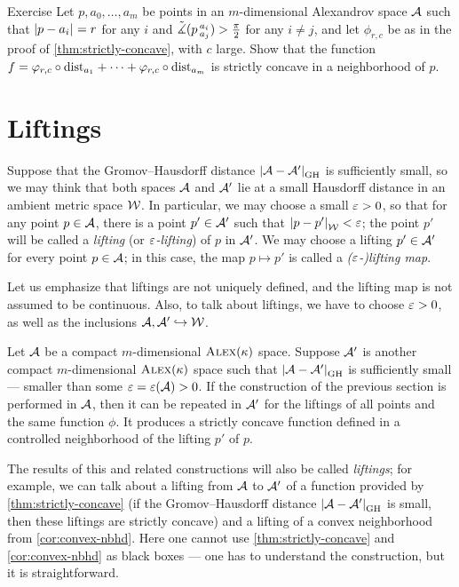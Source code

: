 \begin{thm}{Exercise}\label{ex:dist-chart+strictly-concave}
Let $p,a_0,\dots,a_m$ be points in an $m$-dimensional Alexandrov space $\mathcal{A}$ such that $\dist{p}{a_i}{}=r$ for any $i$ and $\tilde\measuredangle(p\,{}^{a_i}_{a_j})>\tfrac\pi2$
for any $i\ne j$, and let $\phi_{r,c}$ be as in the proof of \ref{thm:strictly-concave}, with $c$ large.
Show that the function $f=\varphi_{r,c}\circ\mathrm{dist}_{a_1}+\dots+\varphi_{r,c}\circ\mathrm{dist}_{a_m}$
is strictly concave in a neighborhood of $p$.
\end{thm}


\section{Liftings}\label{sec:Liftings}

Suppose that the Gromov--Hausdorff distance $\dist{\spc{A}}{\spc{A}'}{\GH}$ is sufficiently small, so we may think that both spaces $\mathcal{A}$ and $\mathcal{A}'$ lie at a small Hausdorff distance in an ambient metric space $\mathcal{W}$.
In particular, we may choose a small $\varepsilon>0$, so that for any point $p\in \mathcal{A}$, there is a point $p'\in \mathcal{A}'$ such that $\dist{p}{p'}{\spc{W}}<\eps$;
the point $p'$ will be called a \emph{lifting} (or {}\emph{$\varepsilon$-lifting}) of $p$ in $\mathcal{A}'$.
We may choose a lifting $p'\in\mathcal{A}'$ for every point $p\in\mathcal{A}$;
in this case, the map $p\mapsto p'$ is called a {}\emph{($\varepsilon$-)lifting map}.

Let us emphasize that liftings are not uniquely defined, and the lifting map is not assumed to be continuous.
Also, to talk about liftings, we have to choose $\varepsilon>0$, as well as the inclusions $\mathcal{A},\mathcal{A}'\hookrightarrow\mathcal{W}$.

Let $\mathcal{A}$ be a compact $m$-dimensional $\textup{\textsc{Alex}}(\kappa)$ space.
Suppose $\mathcal{A}'$ is another compact $m$-dimensional $\textup{\textsc{Alex}}(\kappa)$ space such that $\dist{\spc{A}}{\spc{A}'}{\GH}$ is sufficiently small --- smaller than some $\varepsilon=\varepsilon(\mathcal{A})>0$.
If the construction of the previous section is performed in $\mathcal{A}$,
then it can be repeated in $\mathcal{A}'$ for the liftings of all points and the same function $\phi$.
It produces a strictly concave function defined in a controlled neighborhood of the lifting $p'$ of $p$.

The results of this and related constructions will also be called \emph{liftings};
for example, we can talk about a lifting from $\mathcal{A}$ to $\mathcal{A}'$ of a function provided by \ref{thm:strictly-concave} (if the Gromov--Hausdorff distance $\dist{\spc{A}}{\spc{A}'}{\GH}$ is small, then these liftings are strictly concave)
and a lifting of a convex neighborhood from \ref{cor:convex-nbhd}.
Here one cannot use \ref{thm:strictly-concave} and \ref{cor:convex-nbhd} as black boxes --- one has to understand the construction, but it is straightforward.

